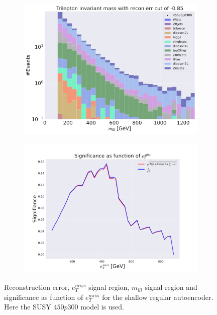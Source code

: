 \begin{figure}[H]
    \hfill
    \begin{subfigure}{.40\textwidth}
        \includegraphics[width=\textwidth]{Figures/AE_testing/small/3lep/b_data_recon_big_rm3_feats_sig_450p0p0300_mlll_recon_errcut_-0.85.pdf}
        \caption{}
        \label{fig:AE_3lep_small_mlll_450_3}
    \end{subfigure}
    \hfill   
    \begin{subfigure}{.40\textwidth}
        \includegraphics[width=\textwidth]{Figures/AE_testing/small/3lep/significance_etmiss_450p0p0300_-0.8533980148308666.pdf}
        \caption{}
        \label{fig:AE_3lep_small_signi_450_3}
    \end{subfigure}
    \hfill      
    \caption[3lep shallow network | $450p300$ | AE | 3]{Reconstruction error, $e_T^{miss}$ signal region, $m_{lll}$ signal region and significance as function of 
    $e_T^{miss}$ for the shallow regular autoencoder. Here the SUSY $450p300$ model is used.}
    \label{fig:AE_3lep_small_rec_sig_signi_450_3}
\end{figure}








